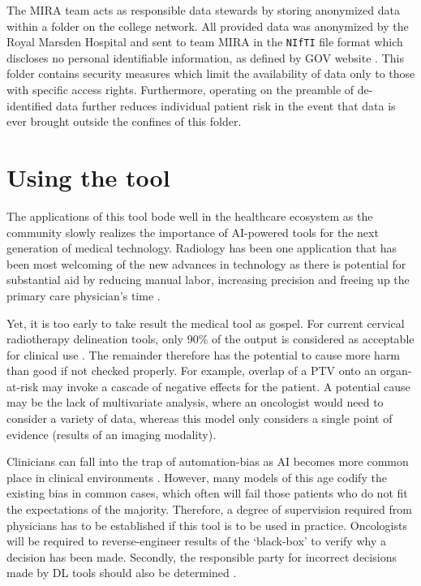\documentclass[11pt,twoside]{report}
\begin{document}
The MIRA team acts as responsible data stewards by storing anonymized data within a folder on the college network. All provided data was anonymized by the Royal Marsden Hospital and sent to team MIRA in the \texttt{NIfTI} file format which discloses no personal identifiable information, as defined by GOV website \cite{gov-gdpr}. This folder contains security measures which limit the availability of data only to those with specific access rights. Furthermore, operating on the preamble of de-identified data further reduces individual patient risk in the event that data is ever brought outside the confines of this folder.

\section{Using the tool}\label{sect:using-the-tool}

The applications of this tool bode well in the healthcare ecosystem as the community slowly realizes the importance of AI-powered tools for the next generation of medical technology. Radiology has been one application that has been most welcoming of the new advances in technology as there is potential for substantial aid by reducing manual labor, increasing precision and freeing up the primary care physician's time \cite{overview-of-ai-medicine}.

Yet, it is too early to take result the medical tool as gospel. For current cervical radiotherapy delineation tools, only 90\% of the output is considered as acceptable for clinical use \cite{auto-delineation-cervical-cancer-development}. The remainder therefore has the potential to cause more harm than good if not checked properly. For example, overlap of a PTV onto an organ-at-risk may invoke a cascade of negative effects for the patient. A potential cause may be the lack of multivariate analysis, where an oncologist would need to consider a variety of data, whereas this model only considers a single point of evidence (results of an imaging modality).

Clinicians can fall into the trap of automation-bias as AI becomes more common place in clinical environments \cite{automation-bias}. However, many models of this age codify the existing bias in common cases, which often will fail those patients who do not fit the expectations of the majority. Therefore, a degree of supervision required from physicians has to be established if this tool is to be used in practice. Oncologists will be required to reverse-engineer results of the `black-box' to verify why a decision has been made. Secondly, the responsible party for incorrect decisions made by DL tools should also be determined \cite{AI-in-cancer-diagnosis-era}.

\printbibliography
{}
\end{document}

